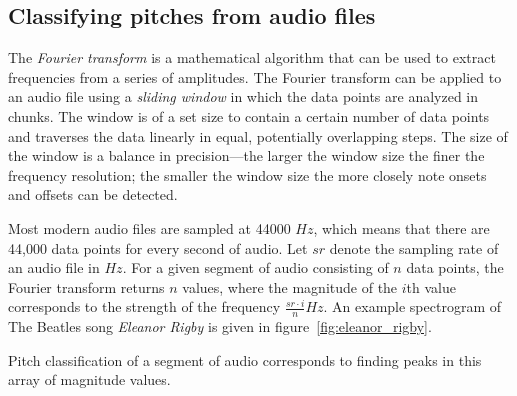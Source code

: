 \subsection{Classifying pitches from audio files}

The \textit{Fourier transform} is a mathematical algorithm that can be used to extract frequencies from a series of amplitudes. The Fourier transform can be applied to an audio file using a \textit{sliding window} in which the data points are analyzed in chunks. The window is of a set size to contain a certain number of data points and traverses the data linearly in equal, potentially overlapping steps. The size of the window is a balance in precision---the larger the window size the finer the frequency resolution; the smaller the window size the more closely note onsets and offsets can be detected.

Most modern audio files are sampled at 44000 $Hz$, which means that there are 44,000 data points for every second of audio. Let $sr$ denote the sampling rate of an audio file in $Hz$. For a given segment of audio consisting of $n$ data points, the Fourier transform returns $n$ values, where the magnitude of the $i$th value corresponds to the strength of the frequency $\frac{sr \cdot i}{n}Hz$. An example spectrogram of The Beatles song \textit{Eleanor Rigby} is given in figure~\ref{fig:eleanor_rigby}.

Pitch classification of a segment of audio corresponds to finding peaks in this array of magnitude values.

